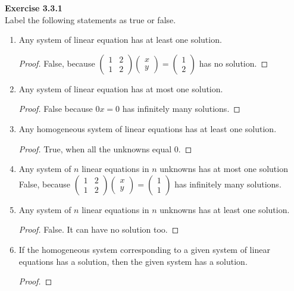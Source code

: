 \documentclass[12pt, a4paper]{article}
\theoremstyle{plain}
\newenvironment{exercise}[2][Exercise]
    { \begin{mdframed}[backgroundcolor=gray!20] \textbf{#1 #2} \\}
    {  \end{mdframed}}
\begin{document}
\begin{exercise}{3.3.1}
Label the following statements as true or false.
\begin{enumerate}[label=(\alph*)]
\item Any system of linear equation has at least one solution.
	\begin{proof}
	False, because $\begin{pmatrix}
	1&2\\
	1&2
	\end{pmatrix}
	\begin{pmatrix}
	x\\
	y
	\end{pmatrix}=
	\begin{pmatrix}
	1\\
	2
	\end{pmatrix}$ has no solution.
	\end{proof}
\item Any system of linear equation has at most one solution.
	\begin{proof}
	False because $0x=0$ has infinitely many solutions.
	\end{proof}
\item Any homogeneous system of linear equations has at least one solution.
	\begin{proof}
	True, when all the unknowns equal $0$.
	\end{proof}
\item Any system of $n$ linear equations in $n$ unknowns has at most one solution
	False, because $\begin{pmatrix}
	1&2\\
	1&2
	\end{pmatrix}
	\begin{pmatrix}
	x\\
	y
	\end{pmatrix}=
	\begin{pmatrix}
	1\\
	1
	\end{pmatrix}$ has infinitely many solutions.
\item Any system of $n$ linear equations in $n$ unknowns has at least one solution.
	\begin{proof}
	False. It can have no solution too.
	\end{proof}
\item If the homogeneous system corresponding to a given system of linear equations has a solution, then the given system has a solution.
	\begin{proof}

\end{proof}
\end{enumerate}
\end{exercise}
\end{document}
